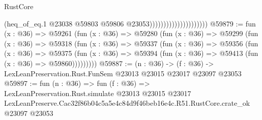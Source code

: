 \begin{lexlean}{RustCore}
\begin{coremodule}
                                            (heq_of_eq.{1}
                                              @23038
                                              @59803
                                              @59806
                                              @23053)))))))))))))))))))))
@59879 := fun (x : @36) =>
  @59261
    (fun (x : @36) =>
    @59280
      (fun (x : @36) =>
      @59299
        (fun (x : @36) =>
        @59318
          (fun (x : @36) =>
          @59337
            (fun (x : @36) =>
            @59356
              (fun (x : @36) =>
              @59375
                (fun (x : @36) => @59394 (fun (x : @36) => @59413 (fun (x : @36) => @59860)))))))))
@59887 := (n : @36) ->
  (f : @36) -> LexLeanPreservation.Rust.FunSem @23013 @23015 @23017 @23097 @23053
@59897 := fun (n : @36) =>
  fun (f : @36) =>
  LexLeanPreservation.Rust.simulate
    @23013
    @23015
    @23017
    LexLeanPreserve.Cac32f86b04c5a5e4c84d9f46beb16e4c.R51.RustCore.crate_ok
    @23097
    @23053
\end{coremodule}
\end{lexlean}
